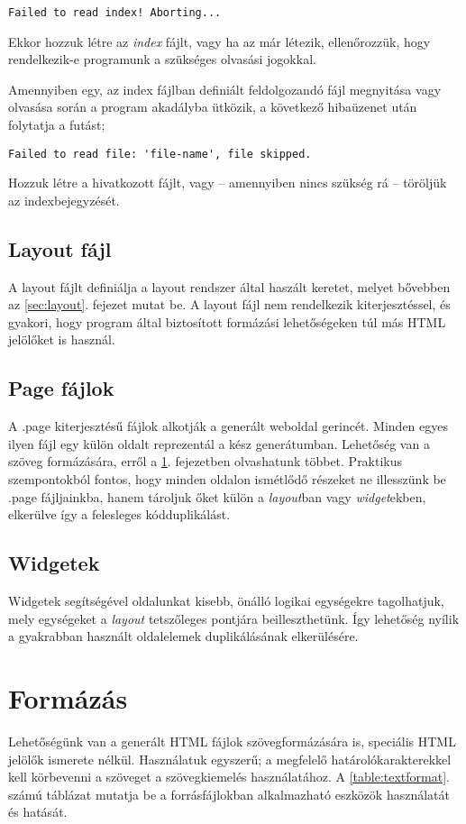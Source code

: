 \documentclass[a4paper,10pt]{article}
\begin{document}
\begin{lstlisting}
Failed to read index! Aborting...
\end{lstlisting}

Ekkor hozzuk létre az \emph{index} fájlt, vagy ha az már létezik, ellenőrozzük, hogy rendelkezik-e programunk a szükséges olvasási jogokkal.

Amennyiben egy, az index fájlban definiált feldolgozandó fájl megnyitása vagy olvasása során a program akadályba ütközik, a következő hibaüzenet után folytatja a futást;

\begin{lstlisting}
Failed to read file: 'file-name', file skipped.
\end{lstlisting}

Hozzuk létre a hivatkozott fájlt, vagy -- amennyiben nincs szükség rá -- töröljük az indexbejegyzését.

\subsection{Layout fájl}
A layout fájlt definiálja a layout rendszer által haszált keretet, melyet bővebben az \ref{sec:layout}. fejezet mutat be. A layout fájl nem rendelkezik kiterjesztéssel, és gyakori, hogy program által biztosított formázási lehetőségeken túl más HTML jelölőket is használ.

\subsection{Page fájlok}
A .page kiterjesztésű fájlok alkotják a generált weboldal gerincét. Minden egyes ilyen fájl egy külön oldalt reprezentál a kész generátumban. Lehetőség van a szöveg formázására, erről a \ref{sec:format}. fejezetben olvashatunk többet.
Praktikus szempontokból fontos, hogy minden oldalon ismétlődő részeket ne illesszünk be .page fájljainkba, hanem tároljuk őket külön a \emph{layout}ban vagy \emph{widget}ekben, elkerülve így a felesleges kódduplikálást.
\subsection{Widgetek}
Widgetek segítségével oldalunkat kisebb, önálló logikai egységekre tagolhatjuk, mely egységeket a \emph{layout} tetszőleges pontjára beilleszthetünk. Így lehetőség nyílik a gyakrabban használt oldalelemek duplikálásának elkerülésére.
\section{Formázás}
\label{sec:format}
Lehetőségünk van a generált HTML fájlok szövegformázására is, speciális HTML jelölők ismerete nélkül. Használatuk egyszerű; a megfelelő határolókarakterekkel kell körbevenni a szöveget a szövegkiemelés használatához. A \ref{table:textformat}. számú táblázat mutatja be a forrásfájlokban alkalmazható eszközök használatát és hatását.
\end{document}
